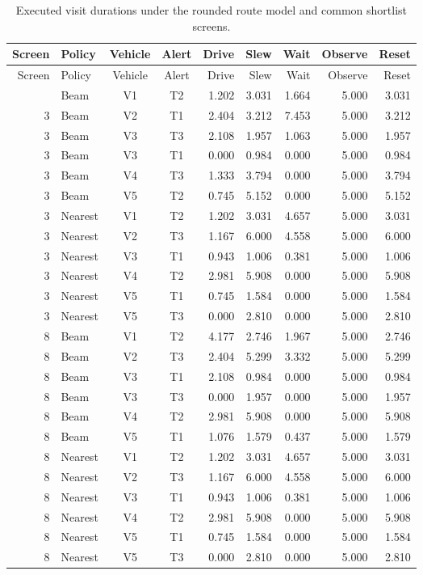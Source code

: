 \begin{longtable}{@{}rlccrrrrr@{}}
\caption{Executed visit durations under the rounded route model and common shortlist screens.}\\
\toprule
Screen & Policy & Vehicle & Alert & Drive & Slew & Wait & Observe & Reset\\
\midrule
\endfirsthead
\toprule
Screen & Policy & Vehicle & Alert & Drive & Slew & Wait & Observe & Reset\\
\midrule
\endhead
\bottomrule
\endlastfoot
3 & Beam & V1 & T2 & 1.202 & 3.031 & 1.664 & 5.000 & 3.031\\
3 & Beam & V2 & T1 & 2.404 & 3.212 & 7.453 & 5.000 & 3.212\\
3 & Beam & V3 & T3 & 2.108 & 1.957 & 1.063 & 5.000 & 1.957\\
3 & Beam & V3 & T1 & 0.000 & 0.984 & 0.000 & 5.000 & 0.984\\
3 & Beam & V4 & T3 & 1.333 & 3.794 & 0.000 & 5.000 & 3.794\\
3 & Beam & V5 & T2 & 0.745 & 5.152 & 0.000 & 5.000 & 5.152\\
3 & Nearest & V1 & T2 & 1.202 & 3.031 & 4.657 & 5.000 & 3.031\\
3 & Nearest & V2 & T3 & 1.167 & 6.000 & 4.558 & 5.000 & 6.000\\
3 & Nearest & V3 & T1 & 0.943 & 1.006 & 0.381 & 5.000 & 1.006\\
3 & Nearest & V4 & T2 & 2.981 & 5.908 & 0.000 & 5.000 & 5.908\\
3 & Nearest & V5 & T1 & 0.745 & 1.584 & 0.000 & 5.000 & 1.584\\
3 & Nearest & V5 & T3 & 0.000 & 2.810 & 0.000 & 5.000 & 2.810\\
8 & Beam & V1 & T2 & 4.177 & 2.746 & 1.967 & 5.000 & 2.746\\
8 & Beam & V2 & T3 & 2.404 & 5.299 & 3.332 & 5.000 & 5.299\\
8 & Beam & V3 & T1 & 2.108 & 0.984 & 0.000 & 5.000 & 0.984\\
8 & Beam & V3 & T3 & 0.000 & 1.957 & 0.000 & 5.000 & 1.957\\
8 & Beam & V4 & T2 & 2.981 & 5.908 & 0.000 & 5.000 & 5.908\\
8 & Beam & V5 & T1 & 1.076 & 1.579 & 0.437 & 5.000 & 1.579\\
8 & Nearest & V1 & T2 & 1.202 & 3.031 & 4.657 & 5.000 & 3.031\\
8 & Nearest & V2 & T3 & 1.167 & 6.000 & 4.558 & 5.000 & 6.000\\
8 & Nearest & V3 & T1 & 0.943 & 1.006 & 0.381 & 5.000 & 1.006\\
8 & Nearest & V4 & T2 & 2.981 & 5.908 & 0.000 & 5.000 & 5.908\\
8 & Nearest & V5 & T1 & 0.745 & 1.584 & 0.000 & 5.000 & 1.584\\
8 & Nearest & V5 & T3 & 0.000 & 2.810 & 0.000 & 5.000 & 2.810\\
\end{longtable}
